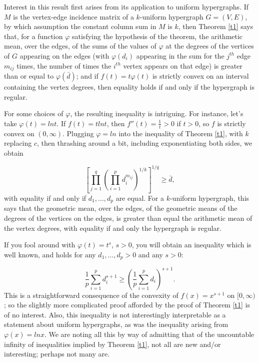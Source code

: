 \documentclass[final,1p,times]{elsarticle}
\begin{document}
Interest in this result first arises from its application to uniform hypergraphs.  If $M$ is the vertex-edge incidence matrix of a $k$-uniform hypergraph $G = (V, E)$, by which assumption the constant column sum in $M$ is $k$, then Theorem \ref {t1} says that, for a function $\varphi$ satisfying the hypothesis of the theorem, the arithmetic mean, over the edges, of the sums of the values of $\varphi$ at the degrees of the vertices of $G$ appearing on the edges (with $\varphi (d_i)$ appearing in the sum for the $j^{th}$ edge $m_{ij}$ times, the number of times the $i^{th}$ vertex appears on that edge) is greater than or equal to $\varphi (\bar {d})$; and if $f(t) = t \varphi (t)$ is strictly convex on an interval containing the vertex degrees, then equality holds if and only if the hypergraph is regular.

For some choices of $\varphi$, the resulting inequality is intriguing.  For instance, let's take $\varphi (t) = lnt$.  If $f(t) = t lnt$, then $f'' (t) = \frac {1}{t} > 0$ if $t > 0$, so $f$ is strictly convex on $(0, \infty)$.  Plugging $\varphi = ln$ into the inequality of Theorem \ref {t1}, with $k$ replacing $c$, then thrashing around a bit, including exponentiating both sides, we obtain

$$
[ \prod _{j=1}^q ( \prod _{i=1}^p d_i^{m_{ij}})^{1/k} ]^{1/q} \geq \bar {d},
$$
with equality if and only if $d_1, \dots, d_p$ are equal.  For a $k$-uniform hypergraph, this says that the geometric mean, over the edges, of the geometric means of the degrees of the vertices on the edges, is greater than equal the arithmetic mean of the vertex degrees, with equality if and only the hypergraph is regular.

If you fool around with $\varphi (t) = t^s$, $s > 0$, you will obtain an inequality which is well known, and holds for any $d_1, \dots, d_p > 0$ and any $s > 0$:

$$
\frac {1}{p} \sum _{i=1}^p d_i^{s+1} \geq (\frac {1}{p} \sum _{i=1}^p d_i)^{s + 1}.
$$
This is a straightforward consequence of the convexity of $f(x) = x^{s+1}$ on $[0, \infty)$; so the slightly more complicated proof afforded by the proof of Theorem \ref {t1} is of no interest.  Also, this inequality is not interestingly interpretable as a statement about uniform hypergraphs, as was the inequality arising from $\varphi (x) = lnx$.  We are noting all this by way of admitting that of the uncountable infinity of inequalities implied by Theorem \ref {t1}, not all are new and/or interesting; perhaps not many are.
\end{document}
